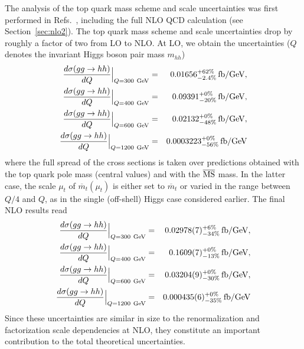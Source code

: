 \noindent The analysis of the top quark mass scheme and scale uncertainties was first performed in Refs.~\cite{Baglio:2018lrj,Baglio:2020wgt,Baglio:2020ini}, including the full NLO QCD calculation (see Section~\ref{sec:nlo2}). The top quark mass scheme and
scale uncertainties drop by roughly a factor of two from LO to NLO. At
LO, we obtain the uncertainties ($Q$ denotes the invariant Higgs boson pair mass $m_{hh}$)
\begin{eqnarray}
\frac{d\sigma(gg\to hh)}{dQ}\Big|_{Q=300~{\rm GeV}} & = &
0.01656^{+62\%}_{-2.4\%}\, \mathrm{fb/GeV},\nonumber\\
\frac{d\sigma(gg\to hh)}{dQ}\Big|_{Q=400~{\rm GeV}} & = &
0.09391^{+0\%}_{-20\%}\, \mathrm{fb/GeV},\nonumber\\
\frac{d\sigma(gg\to hh)}{dQ}\Big|_{Q=600~{\rm GeV}} & = &
0.02132^{+0\%}_{-48\%}\, \mathrm{fb/GeV},\nonumber\\
\frac{d\sigma(gg\to hh)}{dQ}\Big|_{Q=1200~{\rm GeV}} & = &
0.0003223^{+0\%}_{-56\%}\, \mathrm{fb/GeV}
\end{eqnarray}
where the full spread of the cross sections is taken over predictions obtained with the top quark pole mass
(central values) and with the $\overline{\rm MS}$ mass. In the latter case, the scale
$\mu_t$ of $\overline{m}_t(\mu_t)$ is either set to $\overline{m}_t$ or
varied in the range between $Q/4$ and $Q$, as
in the single (off-shell) Higgs case considered earlier. The final NLO
results read \cite{Baglio:2018lrj,Baglio:2020wgt,Baglio:2020ini}
\begin{eqnarray}
\frac{d\sigma(gg\to hh)}{dQ}\Big|_{Q=300~{\rm GeV}} & = &
0.02978(7)^{+6\%}_{-34\%}\, \mathrm{fb/GeV},\nonumber\\
\frac{d\sigma(gg\to hh)}{dQ}\Big|_{Q=400~{\rm GeV}} & = &
0.1609(7)^{+0\%}_{-13\%}\, \mathrm{fb/GeV},\nonumber\\
\frac{d\sigma(gg\to hh)}{dQ}\Big|_{Q=600~{\rm GeV}} & = &
0.03204(9)^{+0\%}_{-30\%}\, \mathrm{fb/GeV},\nonumber\\
\frac{d\sigma(gg\to hh)}{dQ}\Big|_{Q=1200~{\rm GeV}} & = &
0.000435(6)^{+0\%}_{-35\%}\, \mathrm{fb/GeV}
\end{eqnarray}
Since these uncertainties are similar in size to the renormalization
and factorization scale dependencies at NLO, they constitute an important
contribution to the total theoretical uncertainties.

